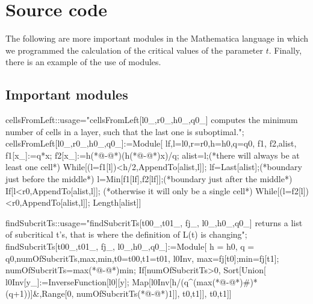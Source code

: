 \chapter{Source code}
The following are more important modules in the Mathematica language in which we programmed the calculation of the critical values of the parameter $t$. Finally, there is an example of the use of modules.

\section{Important modules}
\begin{code}
cellsFromLeft::usage="cellsFromLeft[l0_,r0_,h0_,q0_] 
computes the minimum number of cells in a layer, 
such that the last one is suboptimal.";
cellsFromLeft[l0_,r0_,h0_,q0_]:=Module[
	{lf,l=l0,r=r0,h=h0,q=q0, f1, f2,alist},
	f1[x_]:=q*x; f2[x_]:=h(*@-@*)(h(*@-@*)x)/q;
	alist={l};(*there will always be at least one cell*)
	While[(l=f1[l])<h/2,AppendTo[alist,l]];
	lf=Last[alist];(*boundary just before the middle*)
	l=Min[f1[lf],f2[lf]];(*boundary just after the middle*)
	If[l<r0,AppendTo[alist,l]];
	(*otherwise it will only be a single cell*)
	While[(l=f2[l])<r0,AppendTo[alist,l]];
	Length[alist]]
\end{code}

\begin{code}
findSubcritTs::usage="findSubcritTs[t00_,t01_, fj_, l0_,h0_,q0_] 
returns a list of subcritical t's, that is where the definition 
of L(t) is changing";
findSubcritTs[t00_,t01_, fj_, l0_,h0_,q0_]:=Module[
	{h = h0, q = q0,numOfSubcritTs,max,min,t0=t00,t1=t01, l0Inv},
	max=fj[t0];min=fj[t1];
	numOfSubcritTs=max(*@-@*)min;
	If[numOfSubcritTs>0,
		Sort[Union[
		l0Inv[y_]:=InverseFunction[l0][y];
		Map[l0Inv[h/(q^(max(*@-@*)#)*(q+1))]&,Range[0,
		numOfSubcritTs(*@-@*)1]],
		{t0,t1}]],
		{t0,t1}]]
\end{code}

